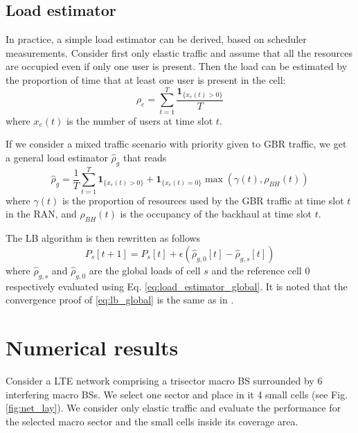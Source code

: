 \documentclass[10pt,draftclsnofoot,onecolumn]{IEEEtran}
\begin{document}
    \subsection*{Load estimator}
    In practice, a simple load estimator can be derived, based on scheduler
measurements. Consider first only elastic traffic and assume that
all the resources are occupied even if only one user is
present. Then the load can be estimated by the proportion of time
that at least one user is present in the cell:
    \begin{equation} \label{eq:load_global_estimate}
    \rho_e = \sum_{t=1}^T \frac{\textbf{1}_{\{x_e(t) > 0\}}}{T}
    \end{equation}
    where $x_e(t)$ is the number of users at time slot $t$.



    If we consider a mixed traffic scenario with priority 
    given to \ac{GBR} traffic, we get a general
load estimator $\hat{\rho}_g$ that reads
    \begin{equation} \label{eq:load_estimator_global}
    \hat{\rho}_g = \frac{1}{T} \sum_{t=1}^T \textbf{1}_{\{x_e(t) > 0\}} + \mathbf{1}_{\{x_e(t) = 0\}} \max(\gamma(t), \rho_{BH}(t))
    \end{equation}
where $\gamma(t)$ is the proportion of resources used by the \ac{GBR} traffic
at time slot $t$ in the \ac{RAN}, and $\rho_{BH}(t)$ is the occupancy of the
backhaul at time slot $t$.

    The \ac{LB} algorithm is then rewritten as follows
    \begin{equation} \label{eq:lb_global}
    P_s[t+1] = P_s[t] + \epsilon (\hat{\rho}_{g,0}[t] - \hat{\rho}_{g,s}[t])
    \end{equation}
where $\hat{\rho}_{g,s}$ and $\hat{\rho}_{g,0}$ are the global loads of cell $s$
and the reference cell $0$ respectively evaluated using Eq.
\eqref{eq:load_estimator_global}. It is noted that the convergence proof of \eqref{eq:lb_global} is the same as in \cite{combes_selforganizationwireless_2012}.

\section{Numerical results} \label{sec:numerical_illustration}
    Consider a \ac{LTE} network comprising a trisector macro \ac{BS} surrounded by 6 interfering
macro \acp{BS}. We select one sector and place in it 4 small cells
(see Fig. \ref{fig:net_lay}). We consider only elastic traffic and
evaluate the performance for the selected macro sector and the small
cells inside its coverage area.
\end{document}
